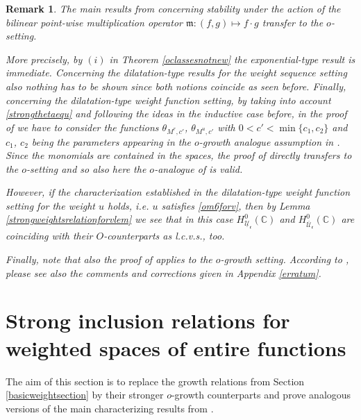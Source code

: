 \documentclass[10pt]{amsart}%
\numberwithin{equation}{section}
\theoremstyle{plain}
\newtheorem{remark}[proposition]{Remark}
\newcommand{\CC}{\mathbb{C}}
\begin{document}
\begin{remark}
\emph{The main results from \cite[Sect. 4]{weightedentirecharacterization} concerning stability under the action of the bilinear point-wise multiplication operator $\mathfrak{m}: (f,g)\mapsto f\cdot g$ transfer to the $o$-setting.}

\emph{More precisely, by $(i)$ in Theorem \ref{oclassesnotnew} the exponential-type result \cite[Prop. 4.1]{weightedentirecharacterization} is immediate. Concerning the dilatation-type results \cite[Thm. 4.8 \& 4.13]{weightedentirecharacterization} for the weight sequence setting also nothing has to be shown since both notions coincide as seen before. Finally, concerning the dilatation-type weight function setting, by taking into account \eqref{strongthetaequ} and following the ideas in the inductive case before, in the proof of \cite[Prop. 4.11]{weightedentirecharacterization} we have to consider the functions $\theta_{M^r,c'}$, $\theta_{M^u,c'}$ with $0<c'<\min\{c_1,c_2\}$ and $c_1$, $c_2$ being the parameters appearing in the $o$-growth analogue assumption in \cite[Prop. 4.11 $(i)$]{weightedentirecharacterization}. Since the monomials are contained in the spaces, the proof of \cite[Prop. 4.12]{weightedentirecharacterization} directly transfers to the $o$-setting and so also here the $o$-analogue of \cite[Thm. 4.13]{weightedentirecharacterization} is valid.}

\emph{However, if the characterization \cite[Thm. 4.13]{weightedentirecharacterization} established in the dilatation-type weight function setting for the weight $u$ holds, i.e. $u$ satisfies \eqref{om6forv}, then by Lemma \ref{strongweightsrelationforvlem} we see that in this case $H^{0}_{\underline{\mathcal{U}}_{\mathfrak{c}}}(\CC)$ and $H^{0}_{\overline{\mathcal{U}}_{\mathfrak{c}}}(\CC)$ are coinciding with their $O$-counterparts as l.c.v.s., too.}

\emph{Finally, note that also the proof of \cite[Cor. 4.14]{weightedentirecharacterization} applies to the $o$-growth setting. According to \cite[Prop. 4.12, Cor. 4.14]{weightedentirecharacterization}, please see also the comments and corrections given in Appendix \ref{erratum}.}
\end{remark}

\section{Strong inclusion relations for weighted spaces of entire functions}\label{stronginclusionsection}
The aim of this section is to replace the growth relations from Section \ref{basicweightsection} by their stronger $o$-growth counterparts and prove analogous versions of the main characterizing results from \cite[Sect. 3.2-3.5]{weightedentirecharacterization}.
\end{document}
